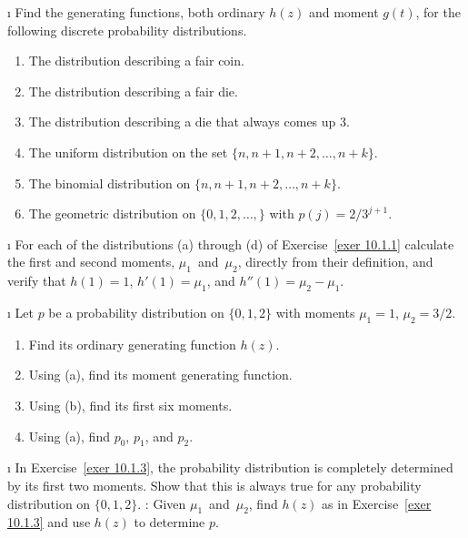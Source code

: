 \exercises
\begin{LJSItem}


\i\label{exer 10.1.1} Find the generating functions, both ordinary $h(z)$
and moment $g(t)$, for the following discrete probability distributions.
\begin{enumerate}
\item The distribution describing a fair coin.

\item The distribution describing a fair die.

\item The distribution describing a die that always comes up 3.

\item The uniform distribution on the set $\{n,n+1,n+2,\ldots,n+k\}$.

\item The binomial distribution on $\{n,n+1,n+2,\ldots,n+k\}$.

\item The geometric distribution on $\{0,1,2,\ldots,\}$ with $p(j) = 2/3^{j + 1}$.
\end{enumerate}

\i\label{exer 10.1.2} For each of the distributions (a) through (d) of Exercise~\ref{exer
10.1.1} calculate the first and second moments, $\mu_1$~and~$\mu_2$, directly from their
definition, and verify that $h(1) = 1$, $h'(1) = \mu_1$, and $h''(1) = \mu_2 -
\mu_1$.

\i\label{exer 10.1.3} Let $p$ be a probability distribution on $\{0,1,2\}$ with
moments $\mu_1 = 1$, $\mu_2 = 3/2$.
\begin{enumerate}
\item Find its ordinary generating function $h(z)$.

\item Using (a), find its moment generating function.

\item Using (b), find its first six moments.

\item Using (a), find $p_0$, $p_1$, and $p_2$.
\end{enumerate}

\i\label{exer 10.1.4} In Exercise~\ref{exer 10.1.3}, the probability distribution is 
completely determined by its first two moments.  Show that this is always true for any
probability distribution on $\{0,1,2\}$.  : Given $\mu_1$~and~$\mu_2$,
find $h(z)$ as in Exercise~\ref{exer 10.1.3} and use $h(z)$ to determine $p$.


\end{LJSItem}
